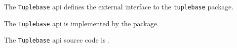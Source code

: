 
The {\tt Tuplebase} api defines the external interface to the {\tt tuplebase} package.

The {\tt Tuplebase} api is implemented by the  package.

The {\tt Tuplebase} api source code is .


